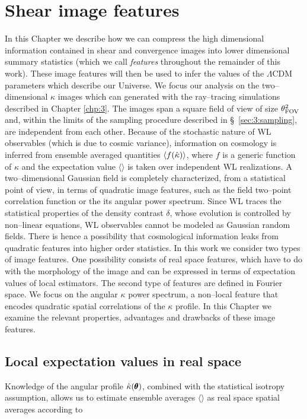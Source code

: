 
\chapter{Shear image features}
 \thispagestyle{plain}
\setlength{\parindent}{10mm}
\label{chp:4}

In this Chapter we describe how we can compress the high dimensional information contained in shear and convergence images into lower dimensional summary statistics (which we call \textit{features} throughout the remainder of this work). These image features will then be used to infer the values of the $\Lambda$CDM parameters which describe our Universe. We focus our analysis on the two--dimensional $\kappa$ images which can generated with the ray--tracing simulations described in Chapter \ref{chp:3}. The images span a square field of view of size $\theta_{\rm FOV}^2$ and, within the limits of the sampling procedure described in \S~\ref{sec:3:sampling}, are independent from each other. Because of the stochastic nature of WL observables (which is due to cosmic variance), information on cosmology is inferred from ensemble averaged quantities $\langle f(\hat{\kappa})\rangle$, where $f$ is a generic function of $\kappa$ and the expectation value $\langle\rangle$ is taken over independent WL realizations. A two--dimensional Gaussian field is completely characterized, from a statistical point of view, in terms of quadratic image features, such as the field two--point correlation function or the its angular power spectrum. Since WL traces the statistical properties of the density contrast $\delta$, whose evolution is controlled by non--linear equations, WL observables cannot be modeled as Gaussian random fields. There is hence a possibility that cosmological information leaks from quadratic features into higher order statistics. In this work we consider two types of image features. One possibility consists of real space features, which have to do with the morphology of the image and can be expressed in terms of expectation values of local estimators. The second type of features are defined in Fourier space. We focus on the angular $\kappa$ power spectrum, a non--local feature that encodes quadratic spatial correlations of the $\kappa$ profile. In this Chapter we examine the relevant properties, advantages and drawbacks of these image features. 

\section{Local expectation values in real space}
Knowledge of the angular profile $\hat{\kappa}(\pmb{\theta})$, combined with the statistical isotropy assumption, allows us to estimate ensemble averages $\langle\rangle$ as real space spatial averages according to 

